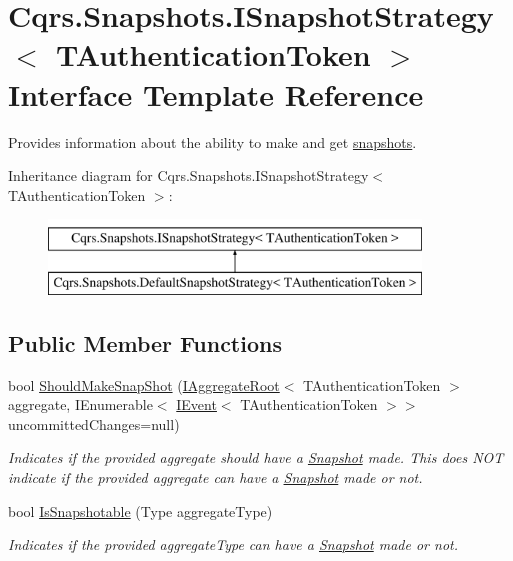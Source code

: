 \hypertarget{interfaceCqrs_1_1Snapshots_1_1ISnapshotStrategy}{}\section{Cqrs.\+Snapshots.\+I\+Snapshot\+Strategy$<$ T\+Authentication\+Token $>$ Interface Template Reference}
\label{interfaceCqrs_1_1Snapshots_1_1ISnapshotStrategy}


Provides information about the ability to make and get \hyperlink{classCqrs_1_1Snapshots_1_1Snapshot}{snapshots}.  


Inheritance diagram for Cqrs.\+Snapshots.\+I\+Snapshot\+Strategy$<$ T\+Authentication\+Token $>$\+:\begin{figure}[H]
\begin{center}
\leavevmode
\includegraphics[height=2.000000cm]{interfaceCqrs_1_1Snapshots_1_1ISnapshotStrategy}
\end{center}
\end{figure}
\subsection*{Public Member Functions}
\begin{DoxyCompactItemize}
\item 
bool \hyperlink{interfaceCqrs_1_1Snapshots_1_1ISnapshotStrategy_aeb5fc714ec8a5b60219426f3aabc0f6c_aeb5fc714ec8a5b60219426f3aabc0f6c}{Should\+Make\+Snap\+Shot} (\hyperlink{interfaceCqrs_1_1Domain_1_1IAggregateRoot}{I\+Aggregate\+Root}$<$ T\+Authentication\+Token $>$ aggregate, I\+Enumerable$<$ \hyperlink{interfaceCqrs_1_1Events_1_1IEvent}{I\+Event}$<$ T\+Authentication\+Token $>$$>$ uncommitted\+Changes=null)
\begin{DoxyCompactList}\small\item\em Indicates if the provided {\itshape aggregate}  should have a \hyperlink{classCqrs_1_1Snapshots_1_1Snapshot}{Snapshot} made. This does N\+OT indicate if the provided {\itshape aggregate}  can have a \hyperlink{classCqrs_1_1Snapshots_1_1Snapshot}{Snapshot} made or not. \end{DoxyCompactList}\item 
bool \hyperlink{interfaceCqrs_1_1Snapshots_1_1ISnapshotStrategy_a02121821312c4ce2811b31eeaffabe51_a02121821312c4ce2811b31eeaffabe51}{Is\+Snapshotable} (Type aggregate\+Type)
\begin{DoxyCompactList}\small\item\em Indicates if the provided {\itshape aggregate\+Type}  can have a \hyperlink{classCqrs_1_1Snapshots_1_1Snapshot}{Snapshot} made or not. \end{DoxyCompactList}\end{DoxyCompactItemize}



